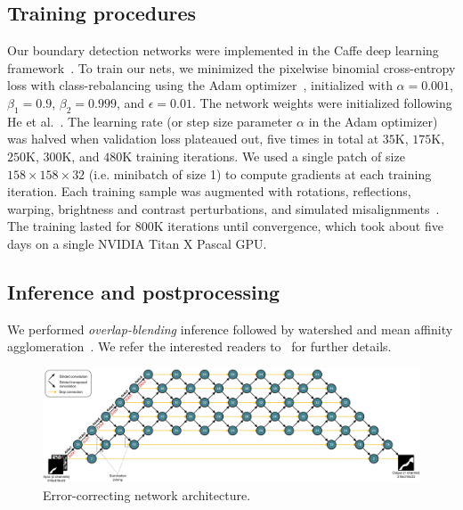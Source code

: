 \subsection{Training procedures} Our boundary detection networks were
implemented in the Caffe deep learning framework~\cite{jia2014caffe}. To train
our nets, we minimized the pixelwise binomial cross-entropy loss with
class-rebalancing using the Adam optimizer~\cite{adam}, initialized with
$\alpha=0.001$, $\beta_1=0.9$, $\beta_2=0.999$, and $\epsilon=0.01$. The network
weights were initialized following He et al.~\cite{he2015delving}. The learning
rate (or step size parameter $\alpha$ in the Adam optimizer) was halved when
validation loss plateaued out, five times in total at $35$K, $175$K, $250$K,
$300$K, and $480$K training iterations. We used a single patch of size
$158\times158\times32$ (i.e. minibatch of size 1) to compute gradients at each
training iteration. Each training sample was augmented with rotations,
reflections, warping, brightness and contrast perturbations, and simulated
misalignments~\cite{kisuk}. The training lasted for $800$K iterations until
convergence, which took about five days on a single NVIDIA Titan X Pascal GPU.

\subsection{Inference and postprocessing} We performed \emph{overlap-blending}
inference followed by watershed and mean affinity agglomeration~\cite{kisuk}. We
refer the interested readers to~\cite{kisuk} for further details.

\label{appendix:architecture}

\begin{figure}
\centering
\includegraphics[width=1.0\linewidth]{corrector.pdf}
\caption{Error-correcting network architecture.}
\label{fig:corrector}
\end{figure}

